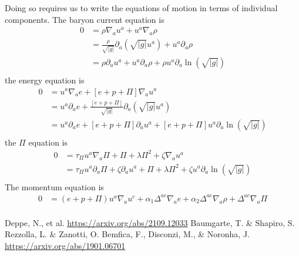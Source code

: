 \documentclass[12pt]{article}
\numberwithin{equation}{section}
\begin{document}
Doing so requires us to write the equations of motion in terms of individual components.
The baryon current equation is
\begin{equation}
\begin{aligned}
0 &= \rho \nabla_{a} u^a + u^a \nabla_{a} \rho \\
&= \frac{\rho}{\sqrt{|g|}} \partial_{a} (\sqrt{|g|} u^a) + u^a \partial_{a} \rho \\
&= \rho \partial_{a} u^a + u^a \partial_{a} \rho + \rho u^a \partial_{a} \ln(\sqrt{|g|}) \\
\end{aligned}
\end{equation}
the energy equation is
\begin{equation}
\begin{aligned}
0 &= u^a \nabla_{a} e + [e + p + \Pi] \nabla_{a} u^a \\
&= u^a \partial_{a} e + \frac{[e + p + \Pi]}{\sqrt{|g|}} \partial_{a} (\sqrt{|g|} u^a) \\
&= u^a \partial_{a} e + [e + p + \Pi] \partial_{a} u^a + [e + p + \Pi] u^a \partial_{a} \ln(\sqrt{|g|}) \\
\end{aligned}
\end{equation}
the $\Pi$ equation is
\begin{equation}
\begin{aligned}
0 &= \tau_{\Pi} u^a \nabla_a \Pi + \Pi + \lambda \Pi^2 + \zeta \nabla_a u^a \\
&= \tau_{\Pi} u^a \partial_a \Pi + \zeta \partial_a u^a + \Pi + \lambda \Pi^2 + \zeta u^a \partial_a \ln(\sqrt{|g|}) \\
\end{aligned}
\end{equation}
The momentum equation is
\begin{equation}
\begin{aligned}
0 &= (e + p + \Pi) u^a \nabla_{a} u^c + \alpha_1 \Delta^{ac} \nabla_a e + \alpha_2 \Delta^{ac} \nabla_a \rho + \Delta^{ac} \nabla_{a} \Pi \\
\end{aligned}
\end{equation}

\clearpage



\clearpage

\begin{thebibliography}{10}
 Deppe, N., et al. \url{https://arxiv.org/abs/2109.12033}
 Baumgarte, T. \& Shapiro, S.
 Rezzolla, L. \& Zanotti, O.
 Bemfica, F., Disconzi, M., \& Noronha, J. \url{https://arxiv.org/abs/1901.06701}
\end{thebibliography}
\end{document}
